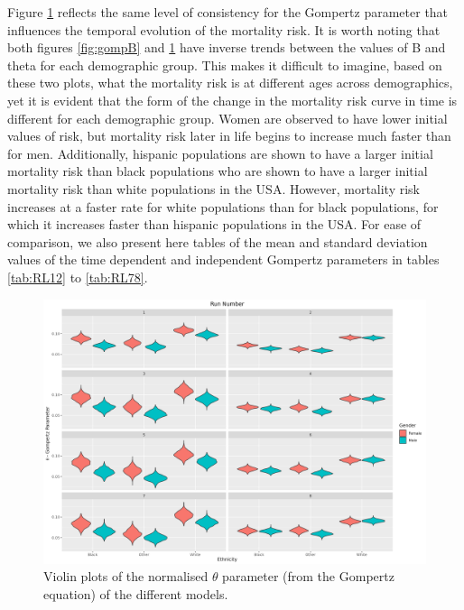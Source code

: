 \documentclass[
]{article}
\begin{document}
Figure \ref{fig:gompt} reflects the same level of consistency for the Gompertz parameter that influences the temporal evolution of the mortality risk. It is worth noting that both figures \ref{fig:gompB} and \ref{fig:gompt} have inverse trends between the values of B and theta for each demographic group. This makes it difficult to imagine, based on these two plots, what the mortality risk is at different ages across demographics, yet it is evident that the form of the change in the mortality risk curve in time is different for each demographic group. Women are observed to have lower initial values of risk, but mortality risk later in life begins to increase much faster than for men. Additionally, hispanic populations are shown to have a larger initial mortality risk than black populations who are shown to have a larger initial mortality risk than white populations in the USA. However, mortality risk increases at a faster rate for white populations than for black populations, for which it increases faster than hispanic populations in the USA. For ease of comparison, we also present here tables of the mean and standard deviation values of the time dependent and independent Gompertz parameters in tables \ref{tab:RL12} to \ref{tab:RL78}.

\begin{figure}
\centering
\includegraphics{./Plots/gompertz/theta_parameter.png}
\caption{Violin plots of the normalised \(\theta\) parameter (from the Gompertz equation) of the different models.}\label{fig:gompt}
\end{figure}
\end{document}
